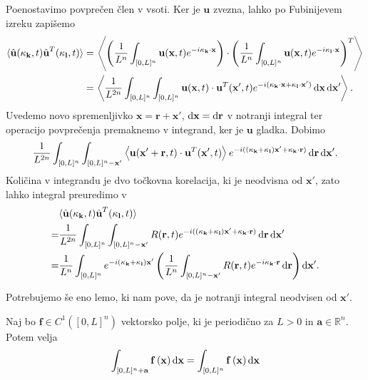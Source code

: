 \documentclass[mat2, tisk]{fmfdelo}
\newcommand{\R}{\mathbb R}
\newcommand{\bd}{\textbf}
\begin{document}
Poenostavimo povprečen člen v vsoti. Ker je $\bd{u}$ zvezna, lahko po Fubinijevem izreku zapišemo 
\begin{align*}
\langle \hat{\bd{u}}(\bd{\text{$\kappa$}}_\bd{k}, t) \hat{\bd{u}}^T(\bd{\text{$\kappa$}}_\bd{l}, t) \rangle &= \left\langle \left(\frac{1}{L^n} \int_{[0, L]^n} \bd{u}(\bd{x}, t) e^{-i\bd{\text{$\kappa$}}_{\bd{k}}\cdot \bd{x}} \right) \cdot \left(\frac{1}{L^n} \int_{[0, L]^n} \bd{u}(\bd{x}, t) e^{-i\bd{\text{$\kappa$}}_\bd{l} \cdot \bd{x}} \right)^T \right\rangle \\
&= \left\langle \frac{1}{L^{2n}} \int_{[0, L]^{n}} \int_{[0, L]^{n}} \bd{u}(\bd{x}, t) \cdot \bd{u}^T(\bd{x}', t) e^{-i(\bd{\text{$\kappa$}}_{\bd{k}}\cdot \bd{x} + \bd{\text{$\kappa$}}_{\bd{l}}\cdot \bd{x}')} \dif\bd{x} \dif\bd{x}' \right\rangle.
\end{align*}
Uvedemo novo spremenljivko $\bd{x} = \bd{r} + \bd{x}'$, $\dif\bd{x} = \dif\bd{r}$ v notranji integral ter operacijo povprečenja premaknemo v integrand, ker 
je $\bd{u}$ gladka. Dobimo
\begin{align*}
\frac{1}{L^{2n}} \int_{[0, L]^{n}} \int_{[0, L]^{n} - \bd{x}'} \left\langle\bd{u}(\bd{x}' + \bd{r}, t) \cdot \bd{u}^T(\bd{x}', t)\right\rangle  e^{-i((\bd{\text{$\kappa$}}_{\bd{k}} + \bd{\text{$\kappa$}}_{\bd{l}})\bd{x}' + \bd{\text{$\kappa$}}_{\bd{k}} \cdot \bd{r})} \dif\bd{r} \dif\bd{x}'.
\end{align*}
Količina v integrandu je dvo točkovna korelacija, ki je neodvisna od $\bd{x}'$,
zato lahko integral preuredimo v
\begin{align}
  &\langle \hat{\bd{u}}(\bd{\text{$\kappa$}}_\bd{k}, t) \hat{\bd{u}}^T(\bd{\text{$\kappa$}}_\bd{l}, t) \rangle \nonumber\\
  =& \frac{1}{L^{2n}} \int_{[0, L]^{n}} \int_{[0, L]^{n} - \bd{x}'} R(\bd{r}, t) e^{-i((\bd{\text{$\kappa$}}_{\bd{k}} + \bd{\text{$\kappa$}}_{\bd{l}})\bd{x}' + \bd{\text{$\kappa$}}_{\bd{k}} \cdot \bd{r})} \dif\bd{r} \dif\bd{x}' \nonumber\\
  =& \frac{1}{L^{n}} \int_{[0, L]^{n}} e^{-i(\bd{\text{$\kappa$}}_{\bd{k}} + \bd{\text{$\kappa$}}_{\bd{l}})\bd{x}'}\left(\frac{1}{L^n}\int_{[0, L]^{n} - \bd{x}'} R(\bd{r}, t) e^{-i\bd{\text{$\kappa$}}_{\bd{k}} \cdot \bd{r}} \dif\bd{r}\right) \dif\bd{x}'.
  \label{kovarianca_integral}
\end{align}

Potrebujemo še eno lemo, ki nam pove, da je notranji integral 
neodvisen od $\bd{x}'$.

\begin{lema}
Naj bo $\bd{f} \in C^1([0, L]^n)$ vektorsko polje, ki je periodično za 
$L>0$ in $\bd{a}\in \R^n$. Potem velja 
\begin{equation*}
\int_{[0, L]^n + \mathbf{a}} \mathbf{f}\,(\mathbf{x}) \dif \mathbf{x} = \int_{[0, L]^n} \mathbf{f}\,(\mathbf{x}) \dif\mathbf{x}
\end{equation*} 
\end{lema}
\end{document}
